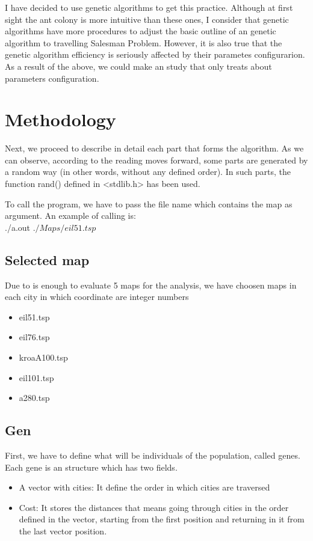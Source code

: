 \documentclass{article}
\begin{document}
    I have decided to use genetic algorithms to get this practice. Although at first sight the ant colony is more 
    intuitive than these ones, I consider that genetic algorithms have more procedures to adjust the basic outline of 
    an genetic algorithm to travelling Salesman Problem. However, it is also true that the genetic algorithm efficiency 
    is seriously affected by their parametes configurarion. As a result of the above, we could make an study that only treats 
    about parameters configuration. 
    
\section{Methodology}
Next, we proceed to describe in detail each part that forms the algorithm. As we can observe, according to the reading moves forward, 
some parts are generated by a random way (in other words, without any defined order). In such parts, the function rand() defined in <stdlib.h> 
has been used.

To call the program, we have to pass the file name which contains the map as argument. An example of calling is:
\\ 
\hspace{5mm} ./a.out $./Maps/eil51.tsp$ 

\subsection{Selected map}
Due to is enough to evaluate 5 maps for the analysis, we have choosen maps in each city in which coordinate are integer numbers 
    \begin{itemize}
        \item eil51.tsp
        \item eil76.tsp
        \item kroaA100.tsp
        \item eil101.tsp
        \item a280.tsp
    \end{itemize}

\subsection{Gen}
First, we have to define what will be individuals of the population, called genes. Each gene is an structure which has two fields.
    \begin{itemize}
        \item A vector with cities: It define the order in which cities are traversed 
        \item Cost: It stores the distances that means going through cities in the order defined in the vector, starting from the 
        first position and returning in it from the last vector position.
    \end{itemize} 
\end{document}
